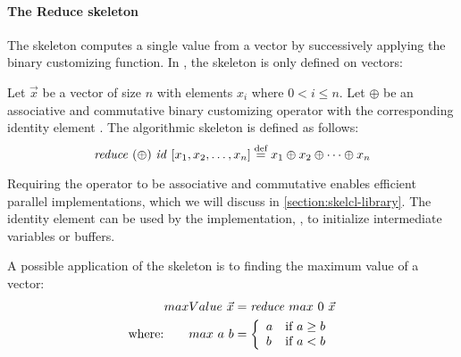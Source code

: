 \paragraph{The Reduce skeleton}
The \reduce skeleton computes a single value from a vector by successively applying the binary customizing function.
In \SkelCL, the \reduce skeleton is only defined on vectors:
\begin{definition}
  \label{definition:reduce}
  Let $\vec{x}$ be a vector of size $n$ with elements $x_i$ where $0 < i \leq n$.
  Let $\oplus$ be an associative and commutative binary customizing operator with the corresponding identity element \id.
  The algorithmic skeleton \reduce is defined as follows:
  \begin{equation*}
    \text{\textit{reduce}}\ (\oplus)\ \text{\textit{id}}\ [x_1, x_2, \dots, x_n]
      \stackrel{\textrm{\scriptsize def}}{=} x_1 \oplus x_2 \oplus \dots \oplus x_n
  \end{equation*}
\end{definition}
\noindent
Requiring the operator to be associative and commutative enables efficient parallel implementations, which we will discuss in \autoref{section:skelcl-library}.
The identity element \id can be used by the implementation, \eg, to initialize intermediate variables or buffers.

A possible application of the \reduce skeleton is to finding the maximum value of a vector:
\begin{align*}
  maxValue\ \vec{x} &= \text{\textit{reduce}}\ max\ 0\ \vec{x}\\
  \text{where:} \qquad max\ a\ b &=
    \left\{
      \begin{array}{l l}
      a & \text{if } a \geq b\\
      b & \text{if } a < b
      \end{array}
    \right.
\end{align*}


